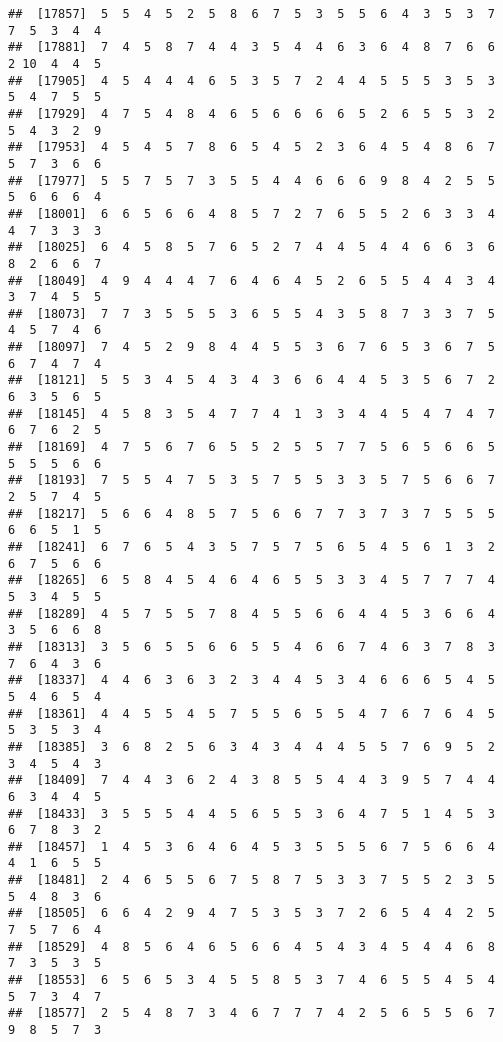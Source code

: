 \documentclass[
]{book}
\begin{document}
\begin{verbatim}
##  [17857]  5  5  4  5  2  5  8  6  7  5  3  5  5  6  4  3  5  3  7  7  5  3  4  4
##  [17881]  7  4  5  8  7  4  4  3  5  4  4  6  3  6  4  8  7  6  6  2 10  4  4  5
##  [17905]  4  5  4  4  4  6  5  3  5  7  2  4  4  5  5  5  3  5  3  5  4  7  5  5
##  [17929]  4  7  5  4  8  4  6  5  6  6  6  6  5  2  6  5  5  3  2  5  4  3  2  9
##  [17953]  4  5  4  5  7  8  6  5  4  5  2  3  6  4  5  4  8  6  7  5  7  3  6  6
##  [17977]  5  5  7  5  7  3  5  5  4  4  6  6  6  9  8  4  2  5  5  5  6  6  6  4
##  [18001]  6  6  5  6  6  4  8  5  7  2  7  6  5  5  2  6  3  3  4  4  7  3  3  3
##  [18025]  6  4  5  8  5  7  6  5  2  7  4  4  5  4  4  6  6  3  6  8  2  6  6  7
##  [18049]  4  9  4  4  4  7  6  4  6  4  5  2  6  5  5  4  4  3  4  3  7  4  5  5
##  [18073]  7  7  3  5  5  5  3  6  5  5  4  3  5  8  7  3  3  7  5  4  5  7  4  6
##  [18097]  7  4  5  2  9  8  4  4  5  5  3  6  7  6  5  3  6  7  5  6  7  4  7  4
##  [18121]  5  5  3  4  5  4  3  4  3  6  6  4  4  5  3  5  6  7  2  6  3  5  6  5
##  [18145]  4  5  8  3  5  4  7  7  4  1  3  3  4  4  5  4  7  4  7  6  7  6  2  5
##  [18169]  4  7  5  6  7  6  5  5  2  5  5  7  7  5  6  5  6  6  5  5  5  5  6  6
##  [18193]  7  5  5  4  7  5  3  5  7  5  5  3  3  5  7  5  6  6  7  2  5  7  4  5
##  [18217]  5  6  6  4  8  5  7  5  6  6  7  7  3  7  3  7  5  5  5  6  6  5  1  5
##  [18241]  6  7  6  5  4  3  5  7  5  7  5  6  5  4  5  6  1  3  2  6  7  5  6  6
##  [18265]  6  5  8  4  5  4  6  4  6  5  5  3  3  4  5  7  7  7  4  5  3  4  5  5
##  [18289]  4  5  7  5  5  7  8  4  5  5  6  6  4  4  5  3  6  6  4  3  5  6  6  8
##  [18313]  3  5  6  5  5  6  6  5  5  4  6  6  7  4  6  3  7  8  3  7  6  4  3  6
##  [18337]  4  4  6  3  6  3  2  3  4  4  5  3  4  6  6  6  5  4  5  5  4  6  5  4
##  [18361]  4  4  5  5  4  5  7  5  5  6  5  5  4  7  6  7  6  4  5  5  3  5  3  4
##  [18385]  3  6  8  2  5  6  3  4  3  4  4  4  5  5  7  6  9  5  2  3  4  5  4  3
##  [18409]  7  4  4  3  6  2  4  3  8  5  5  4  4  3  9  5  7  4  4  6  3  4  4  5
##  [18433]  3  5  5  5  4  4  5  6  5  5  3  6  4  7  5  1  4  5  3  6  7  8  3  2
##  [18457]  1  4  5  3  6  4  6  4  5  3  5  5  5  6  7  5  6  6  4  4  1  6  5  5
##  [18481]  2  4  6  5  5  6  7  5  8  7  5  3  3  7  5  5  2  3  5  5  4  8  3  6
##  [18505]  6  6  4  2  9  4  7  5  3  5  3  7  2  6  5  4  4  2  5  7  5  7  6  4
##  [18529]  4  8  5  6  4  6  5  6  6  4  5  4  3  4  5  4  4  6  8  7  3  5  3  5
##  [18553]  6  5  6  5  3  4  5  5  8  5  3  7  4  6  5  5  4  5  4  5  7  3  4  7
##  [18577]  2  5  4  8  7  3  4  6  7  7  7  4  2  5  6  5  5  6  7  9  8  5  7  3

\end{verbatim}
\end{document}
